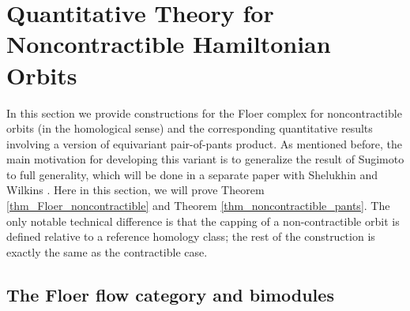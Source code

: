 \documentclass[reqno, 10pt]{amsart}
\numberwithin{equation}{section}
\numberwithin{equation}{section}
\theoremstyle{definition}
\theoremstyle{remark}
\begin{document}
\section{Quantitative Theory for Noncontractible Hamiltonian Orbits}\label{section_noncontractible}

In this section we provide constructions for the Floer complex for noncontractible orbits (in the homological sense) and the corresponding quantitative results involving a version of equivariant pair-of-pants product. As mentioned before, the main motivation for developing this variant is to generalize the result of Sugimoto \cite{Sugimoto_2026} to full generality, which will be done in a separate paper with Shelukhin and Wilkins \cite{BSWX}. Here in this section, we will prove Theorem \ref{thm_Floer_noncontractible} and Theorem \ref{thm_noncontractible_pants}. The only notable technical difference is that the capping of a non-contractible orbit is defined relative to a reference homology class; the rest of the construction is exactly the same as the contractible case.

\subsection{The Floer flow category and bimodules}
\end{document}
